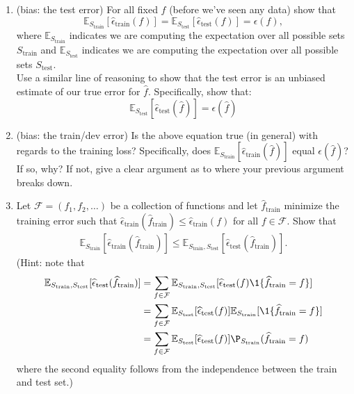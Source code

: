 \documentclass{article}
\begin{document}
\begin{bprob}
    \begin{enumerate}
        \item {} (bias: the test error) For all fixed $f$ (before we've seen any data) show that
        \[
        \mathbb{E}_{S_\textrm{train}}[ \widehat{\epsilon}_{\textrm{train}}(f) ] = \mathbb{E}_{S_\textrm{test}}[ \widehat{\epsilon}_{\textrm{test}}(f) ] = \epsilon(f),
        \]
        where $\mathbb{E}_{S_\textrm{train}}$ indicates we are computing the expectation over all possible sets $S_{\textrm{train}}$ and $\mathbb{E}_{S_\textrm{test}}$ indicates we are computing the expectation over all possible sets $S_{\textrm{test}}$. \\
        Use a similar line of reasoning to show that the test error is an unbiased estimate of our true error for $\hat{f}$. Specifically, show that:
        \[
          \mathbb{E}_{S_\textrm{test}}[\widehat{\epsilon}_{\textrm{test}}(\widehat{f})] = \epsilon(\widehat{f})
        \]
        \item {} (bias: the train/dev error) Is the above equation true (in general) with regards to the training loss? Specifically, does $\mathbb{E}_{S_\textrm{train}}[\widehat{\epsilon}_{\textrm{train}}(\widehat{f})]$ equal $\epsilon(\widehat{f})$? If so, why? If not, give a clear argument as to where your previous argument breaks down.
        \item {} Let $\mathcal{F} = (f_1, f_2,\dots)$ be a collection of functions and let $\widehat{f}_{\textrm{train}}$ minimize the training error such that $\widehat{\epsilon}_{\textrm{train}}(\widehat{f}_{\textrm{train}}) \leq \widehat{\epsilon}_{\textrm{train}}(f)$ for all $f \in \mathcal{F}$.
        Show that
        \begin{align*}
            \mathbb{E}_{S_\text{train}}[ \widehat{\epsilon}_{\textrm{train}}(\widehat{f}_{\textrm{train}}) ] \leq \mathbb{E}_{S_\text{train}, S_\text{test}}[ \widehat{\epsilon}_{\textrm{test}}(\widehat{f}_{\textrm{train}}) ].
        \end{align*}
        (Hint: note that
        \begin{align*}
            \mathbb{E}_{S_\text{train}, S_\text{test}}[ \widehat{\epsilon}_{\textrm{test}}(\widehat{f}_{\textrm{train}}) ] &= \sum_{f \in \mathcal{F}} \mathbb{E}_{S_\text{train}, S_{\textrm{test}}}[ \widehat{\epsilon}_{\textrm{test}}(f) \1\{ \widehat{f}_{\textrm{train}} = f\}] \\
            &= \sum_{f \in \mathcal{F}} \mathbb{E}_{S_\text{test}}[ \widehat{\epsilon}_{\textrm{test}}(f) ] \mathbb{E}_{S_\text{train}}[ \1\{\widehat{f}_{\textrm{train}} = f \}]\\
            &= \sum_{f \in \mathcal{F}} \mathbb{E}_{S_\text{test}}[ \widehat{\epsilon}_{\textrm{test}}(f) ] \P_{S_\text{train}}(\widehat{f}_{\textrm{train}} = f )
        \end{align*}
        where the second equality follows from the independence between the train and test set.)
        \newline
    \end{enumerate}  

\end{bprob}
\end{document}
